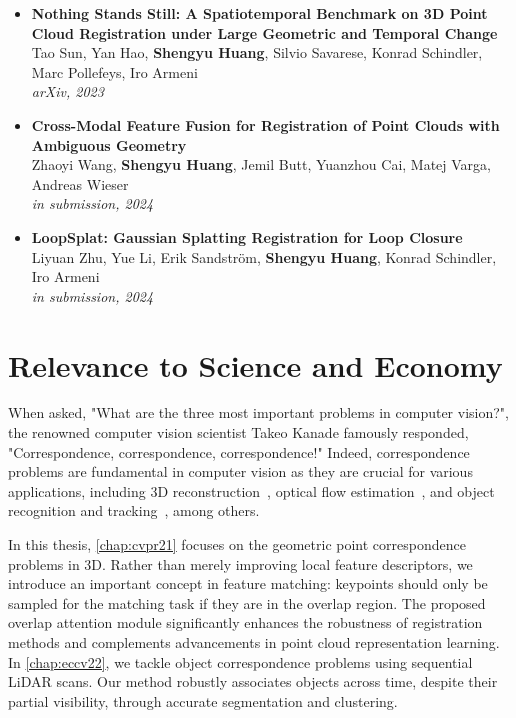 \begin{itemize}
    \item \noindent\textbf{ Nothing Stands Still: A Spatiotemporal Benchmark on 3D Point Cloud Registration under Large Geometric and Temporal Change} \\[0.5em]
    Tao Sun, Yan Hao, \textbf{Shengyu Huang}, Silvio Savarese, Konrad Schindler, Marc Pollefeys, Iro Armeni \\
    \textit{arXiv, 2023}
    
    \item \noindent\textbf{ Cross-Modal Feature Fusion for Registration of Point Clouds with Ambiguous Geometry} \\[0.5em]
    Zhaoyi Wang, \textbf{Shengyu Huang}, Jemil Butt, Yuanzhou Cai, Matej Varga, Andreas Wieser \\
    \textit{in submission, 2024}

    \item \noindent\textbf{ LoopSplat: Gaussian Splatting Registration for Loop Closure} \\[0.5em]
    Liyuan Zhu, Yue Li, Erik Sandström, \textbf{Shengyu Huang}, Konrad Schindler, Iro Armeni \\
    \textit{in submission, 2024}

\end{itemize}


\section{Relevance to Science and Economy}
When asked, "What are the three most important problems in computer vision?", the renowned computer vision scientist Takeo Kanade famously responded, "Correspondence, correspondence, correspondence!" Indeed, correspondence problems are fundamental in computer vision as they are crucial for various applications, including 3D reconstruction~\cite{schoenberger2016mvs,schoenberger2016sfm}, optical flow estimation~\cite{dosovitskiy2015flownet,sun2018pwc}, and object recognition and tracking~\cite{tang2023emergent}, among others. 

In this thesis, \cref{chap:cvpr21} focuses on the geometric point correspondence problems in 3D. Rather than merely improving local feature descriptors, we introduce an important concept in feature matching: keypoints should only be sampled for the matching task if they are in the overlap region. The proposed overlap attention module significantly enhances the robustness of registration methods and complements advancements in point cloud representation learning. In \cref{chap:eccv22}, we tackle object correspondence problems using sequential LiDAR scans. Our method robustly associates objects across time, despite their partial visibility, through accurate segmentation and clustering.

